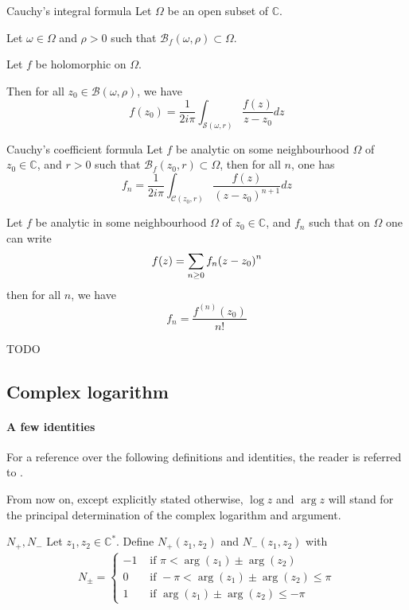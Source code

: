\documentclass[../main.tex]{subfiles}
\begin{document}
\begin{thm}{Cauchy's integral formula}\label{thm_cauchy_integral}
	Let $\Omega$ be an open subset of $\mathbb{C}$.
	
	Let $\omega \in \Omega$ and $\rho > 0$ such that
	$\mathcal{B}_f (\omega, \rho) \subset \Omega$.
	
	Let $f$ be holomorphic on $\Omega$.
	
	Then for all $z_0 \in \mathcal{B} (\omega, \rho)$, we have
	\begin{equation*}
		f(z_0) = \frac{1}{2 i \pi} \int_{\mathcal{S} (\omega, r)} \frac{f(z)}{z - z_0} dz
	\end{equation*}
\end{thm}

\begin{cor}{Cauchy's coefficient formula}\label{thm_cauchy_coefficients}
	Let $f$ be analytic on some neighbourhood $\Omega$ of $z_0 \in \mathbb{C}$, and $r > 0$ such that $\mathcal{B}_f (z_0, r) \subset \Omega$, then for all $n$, one has
	\[
	f_n = \frac{1}{2i\pi} \int_{\mathcal{C} (z_0, r)}
	\frac{f(z)}{{(z - z_0)}^{n+1}} dz
	\]
\end{cor}

\begin{thm}{}
	Let $f$ be analytic in some neighbourhood $\Omega$ of $z_0 \in \mathbb{C}$, and $f_n$ such that on $\Omega$ one can write
	$$
	f(z) = \sum\limits_{n \geq 0} f_n {(z - z_0)}^n
	$$
	then for all $n$, we have
	$$
	f_n = \frac{f^{(n)}(z_0)}{n!}
	$$
\end{thm}


TODO

\subsection{Complex logarithm}

\paragraph{A few identities}

For a reference over the following definitions and identities, the reader is referred to \cite{Brown1996}.

From now on, except explicitly stated otherwise, $\log z$ and $\arg z$ will stand for the principal determination of the complex logarithm and argument.

\begin{definition}{{$N_+, N_-$}}
	Let $z_1, z_2 \in \mathbb{C}^*$. Define $N_+(z_1, z_2)$ and $N_-(z_1, z_2)$ with
	\begin{align*}
	N_\pm =
	\begin{cases}
	-1 &\text{ if } \pi < \arg (z_1) \pm \arg (z_2)\\
	0  &\text{ if } - \pi < \arg (z_1) \pm \arg (z_2) \leq \pi \\
	1  &\text{ if } \arg (z_1) \pm \arg (z_2) \leq -\pi
	\end{cases}
	\end{align*}
\end{definition}
\end{document}
